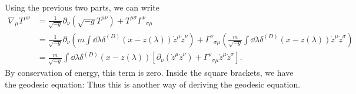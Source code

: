 \documentclass{article}
\numberwithin{equation}{section}
\begin{document}
\begin{enumerate}[label=(\alph*)]
    Using the previous two parts, we can write 
    \begin{align}
        \nabla_{\mu}T^{\mu\nu} &= \frac{1}{\sqrt{-g}}\partial_{\nu}(\sqrt{-g}T^{\mu\nu}) + T^{\mu\sigma}\Gamma^{\nu}{}_{\sigma\mu} \\ 
        &= \frac{1}{\sqrt{-g}}\partial_{\nu}\left(m\int\dd{\lambda}\delta^{(D)}(x-z(\lambda))\dot{z}^\mu\dot{z}^\nu\right) + \Gamma^{\nu}{}_{\sigma\mu}\left(\frac{m}{\sqrt{-g}}\int\dd{\lambda}\delta^{(D)}(x-z(\lambda))\dot{z}^\mu\dot{z}^\sigma\right) \\ 
        &= \frac{m}{\sqrt{-g}}\int \dd{\lambda}\delta^{(D)}(x-z(\lambda))\left[\partial_\nu (\dot{z}^\mu\dot{z}^{\nu}) + \Gamma^{\nu}{}_{\sigma\mu} \dot{z}^\mu \dot{z}^{\sigma}\right].
    \end{align}
     By conservation of energy, this term is zero. Inside the square brackets, we have the geodesic equation: Thus this is another way of deriving the geodesic equation.
\end{enumerate}
\end{document}
